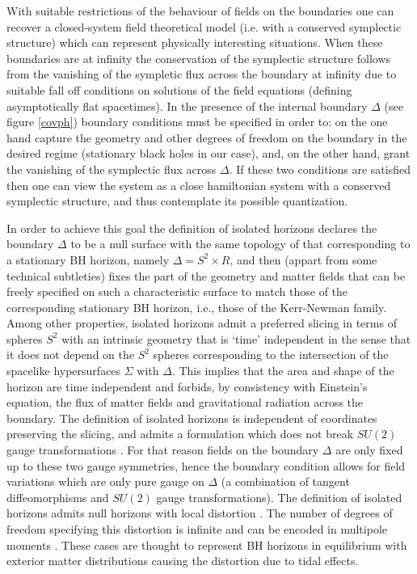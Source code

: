 \documentclass[aps, nofootinbib,superscriptaddress,12pt]{revtex4-2}
\begin{document}
With suitable restrictions of the behaviour of fields on the boundaries one can recover a closed-system field theoretical model (i.e. with a conserved symplectic structure) which  can represent physically interesting situations.
When these boundaries are at infinity the conservation of the symplectic structure follows from the vanishing of the sympletic flux across the boundary at infinity due to suitable fall off conditions  on solutions of the field equations (defining asymptotically flat spacetimes). In the presence of the internal boundary $\Delta$ (see figure \ref{covph})  boundary conditions must be specified in order to: on the one hand capture the geometry and other degrees of freedom on the boundary in the desired regime (stationary black holes in our case), and, on the other hand, grant the vanishing of the symplectic flux across $\Delta$. If these two conditions are satisfied then one can view the system as a close hamiltonian system with a conserved symplectic structure, and thus contemplate its possible quantization.

In order to achieve this goal the definition of isolated horizons declares the boundary $\Delta$ to be a null surface with the same topology of that corresponding to a stationary BH horizon, namely $\Delta=S^2\times R$, and then (appart from some technical subtleties) fixes the part of the geometry and matter fields that can be freely specified on such a characteristic surface to match those of the corresponding stationary BH horizon, i.e., those of the Kerr-Newman family. Among other  properties, isolated horizons admit a preferred slicing in terms of spheres $S^2$ with an intrinsic geometry that is `time' independent in the sense that it does not depend on the $S^2$ spheres corresponding to the intersection of the spacelike hypersurfaces $\Sigma$ with $\Delta$.  This implies that the area and shape of the horizon are time independent and forbids,  by consistency with Einstein's equation, the flux of matter fields and gravitational radiation across the boundary. The definition of isolated horizons is independent of coordinates preserving the slicing, and admits a formulation which does not break $SU(2)$ gauge transformations \cite{Engle:2009vc, Engle:2010kt, Engle:2009zz}. For that reason fields on the boundary $\Delta$ are only fixed up to these two gauge symmetries, hence the boundary condition allows for field variations which are only pure gauge on $\Delta$ (a combination of tangent diffeomorphisms and $SU(2)$ gauge transformations). The definition of isolated horizons admits null horizons with local distortion \cite{Ashtekar:2004nd}. The number of degrees of freedom specifying this distortion is infinite and can be encoded in multipole moments \cite{Ashtekar:2004gp}. These cases are thought to represent BH horizons in equilibrium with exterior matter distributions causing the distortion due to tidal effects.
\end{document}
